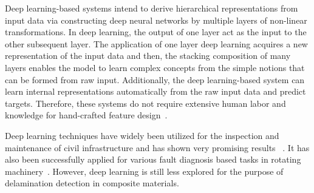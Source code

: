 Deep learning-based systems intend to derive hierarchical representations from input data via constructing deep neural networks by multiple layers of non-linear transformations. In deep learning, the output of one layer act as the input to the other subsequent layer. The application of one layer deep learning acquires a new representation of the input data and then, the stacking composition of many layers enables the model to learn complex concepts from the simple notions that can be formed from raw input. Additionally, the deep learning-based system can learn internal representations automatically from the raw input data and predict targets. Therefore, these systems do not require extensive human labor and knowledge for hand-crafted feature design~\cite{zhao2019deep, yuan2020machine}.

Deep learning techniques have widely been utilized for the inspection and maintenance of civil infrastructure and has shown very promising results ~\cite{cha2017deep, lin2017structural, liu2019computer}. It has also been successfully applied for various fault diagnosis based tasks in rotating machinery~\cite{jia2016deep, janssens2016convolutional}. However, deep learning is still less explored for the purpose of delamination detection in composite materials.   

